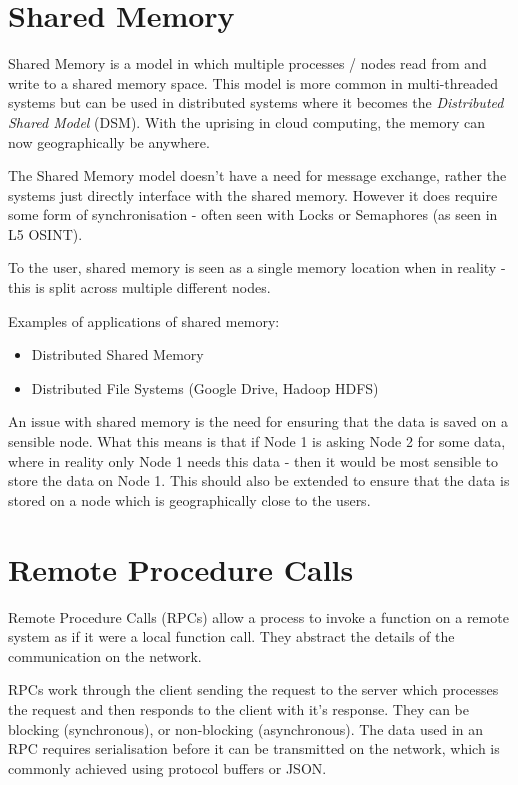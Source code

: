 \section{Shared Memory}
Shared Memory is a model in which multiple processes / nodes read from and write to a shared memory space. This model is more common in multi-threaded systems but can be used in distributed systems where it becomes the \textit{Distributed Shared Model} (DSM). With the uprising in cloud computing, the memory can now geographically be anywhere. 

The Shared Memory model doesn't have a need for message exchange, rather the systems just directly interface with the shared memory. However it does require some form of synchronisation - often seen with Locks or Semaphores (as seen in L5 OSINT). 

To the user, shared memory is seen as a single memory location when in reality - this is split across multiple different nodes. 

Examples of applications of shared memory:
\begin{itemize}
    \item Distributed Shared Memory
    \item Distributed File Systems (Google Drive, Hadoop HDFS)
\end{itemize}

An issue with shared memory is the need for ensuring that the data is saved on a sensible node. What this means is that if Node 1 is asking Node 2 for some data, where in reality only Node 1 needs this data - then it would be most sensible to store the data on Node 1. This should also be extended to ensure that the data is stored on a node which is geographically close to the users.

\section{Remote Procedure Calls}
Remote Procedure Calls (RPCs) allow a process to invoke a function on a remote system as if it were a local function call. They abstract the details of the communication on the network. 

RPCs work through the client sending the request to the server which processes the request and then responds to the client with it's response. They can be blocking (synchronous), or non-blocking (asynchronous). The data used in an RPC requires serialisation before it can be transmitted on the network, which is commonly achieved using protocol buffers or JSON.

